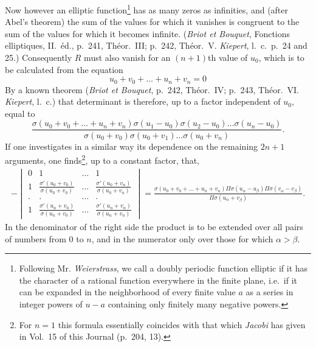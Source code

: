 \documentclass[12pt]{article}
\begin{document}
Now however an elliptic function\footnote{Following Mr. \textit{Weierstrass}, we call a doubly periodic function elliptic if it has the character of a rational function everywhere in the finite plane, i.e.\ if it can be expanded in the neighborhood of every finite value $a$ as a series in integer powers of $u-a$ containing only finitely many negative powers.} has as many zeros as infinities, and (after Abel's theorem) the sum of the values for which it vanishes is congruent to the sum of the values for which it becomes infinite. (\textit{Briot et Bouquet}, Fonctions elliptiques, II.~éd., p.~241, Théor.~III; p.~242, Théor.~V. \textit{Kiepert}, l.~c.~p.~24 and 25.) Consequently $R$ must also vanish for an $(n+1)$th value of $u_0$, which is to be calculated from the equation
\begin{equation*}
u_0 + v_0 + \dots + u_n + v_n = 0
\end{equation*}
By a known theorem (\textit{Briot et Bouquet}, p.~242, Théor.~IV; p.~243, Théor.~VI. \textit{Kiepert}, l.~c.) that determinant is therefore, up to a factor independent of $u_0$, equal to
\begin{equation*}
\frac{\sigma(u_0+v_0+\dots+u_n+v_n)\sigma(u_1-u_0)\sigma(u_2-u_0)\dots\sigma(u_n-u_0)}{\sigma(u_0+v_0)\sigma(u_0+v_1)\dots\sigma(u_0+v_n)}.
\end{equation*}
If one investigates in a similar way its dependence on the remaining $2n+1$ arguments, one finds\footnote{For $n=1$ this formula essentially coincides with that which \textit{Jacobi} has given in Vol.~15 of this Journal (p.~204, 13).}, up to a constant factor, that,
\begin{equation}
\begin{aligned}
-\begin{vmatrix}
0 & 1 & \dots & 1 \\
1 & \frac{\sigma'(u_0+v_0)}{\sigma(u_0+v_0)} & \dots & \frac{\sigma'(u_0+v_n)}{\sigma(u_0+v_n)} \\
. & . & \dots & . \\
1 & \frac{\sigma'(u_n+v_0)}{\sigma(u_n+v_0)} & \dots & \frac{\sigma'(u_n+v_n)}{\sigma(u_n+v_n)}
\end{vmatrix} 
= \frac{\sigma(u_0+v_0+\dots+u_n+v_n)\Pi\sigma(u_\alpha-u_\beta)\Pi\sigma(v_\alpha-v_\beta)}{\Pi\sigma(u_\alpha+v_\beta)}.
\end{aligned}
\end{equation}
In the denominator of the right side the product is to be extended over all pairs of numbers from $0$ to $n$, and in the numerator only over those for which $\alpha > \beta$.
\end{document}
